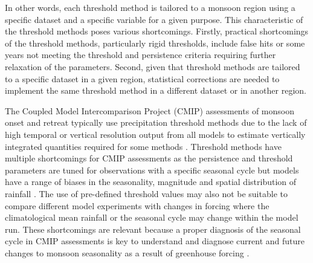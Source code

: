 In other words, each threshold method is tailored to a monsoon region using a specific dataset and a specific variable for a given purpose. This characteristic of the threshold methods poses various shortcomings.  
 Firstly, practical shortcomings of the threshold methods, particularly rigid thresholds, include false hits \citep{moron2014interannual} or some years not meeting the threshold and persistence criteria \citep{arias2012} requiring further relaxation of the parameters. Second, given that threshold methods are tailored to a specific dataset in a given region, statistical corrections are needed to implement the same threshold method in a different dataset or in another region. 
 
 The Coupled Model Intercomparison Project (CMIP) assessments of monsoon onset and retreat typically use precipitation threshold methods due to the lack of high temporal or vertical resolution output from all models to estimate vertically integrated quantities required for some methods \citep[e.g.][]{geil2013,zou2015,jamoon2020}. Threshold methods have multiple shortcomings for CMIP assessments as the persistence and threshold parameters are tuned for observations with a specific seasonal cycle but models have a range of biases in the seasonality, magnitude and spatial distribution of rainfall \citep{pascale2019,garciafranco2020}. 
The use of pre-defined threshold values may also not be suitable to compare different model experiments with changes in forcing where the climatological mean rainfall or the seasonal cycle may change within the model run.
These shortcomings are relevant because a proper diagnosis of the seasonal cycle in CMIP assessments is key to understand and diagnose current and future changes to monsoon seasonality as a result of greenhouse forcing \citep{zhou2016,wang2017}. 


